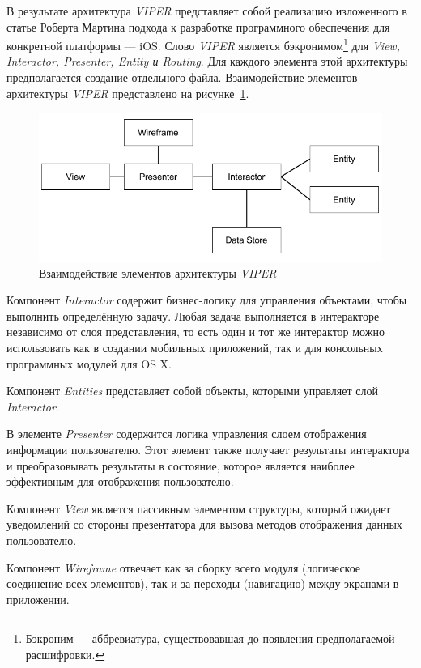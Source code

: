 В результате архитектура \textit{VIPER} представляет собой реализацию
изложенного в статье Роберта Мартина подхода к разработке программного обеспечения
для конкретной платформы --- iOS. Слово \textit{VIPER} является
бэкронимом\footnote{Бэкроним --- аббревиатура, существовавшая до появления
предполагаемой расшифровки.} для \textit{View,
Interactor, Presenter, Entity и Routing}. Для каждого элемента этой архитектуры
предполагается создание отдельного файла. Взаимодействие элементов архитектуры
\textit{VIPER} представлено на рисунке~\ref{fig:viper}.
\begin{figure}[h!]
  \centering
  \includegraphics[width=150mm]{fig/viper}
  \caption{Взаимодействие элементов архитектуры \textit{VIPER}}
  \label{fig:viper}
\end{figure}

Компонент \textit{Interactor} содержит бизнес-логику для управления объектами,
чтобы выполнить определённую задачу. Любая задача выполняется в интеракторе независимо
от слоя представления, то есть один и тот же интерактор можно использовать как в
создании мобильных приложений, так и для консольных программных модулей для OS X.

Компонент \textit{Entities} представляет собой объекты, которыми управляет
слой \textit{Interactor}.

В элементе \textit{Presenter} содержится логика управления слоем
отображения информации пользователю. Этот элемент также получает результаты
интерактора и преобразовывать результаты в состояние, которое является наиболее
эффективным для отображения пользователю.

Компонент \textit{View} является пассивным элементом структуры, который ожидает уведомлений
со стороны презентатора для вызова методов отображения данных пользователю.

Компонент \textit{Wireframe} отвечает как за сборку всего модуля (логическое
соединение всех элементов), так и за переходы (навигацию) между экранами
в приложении.

